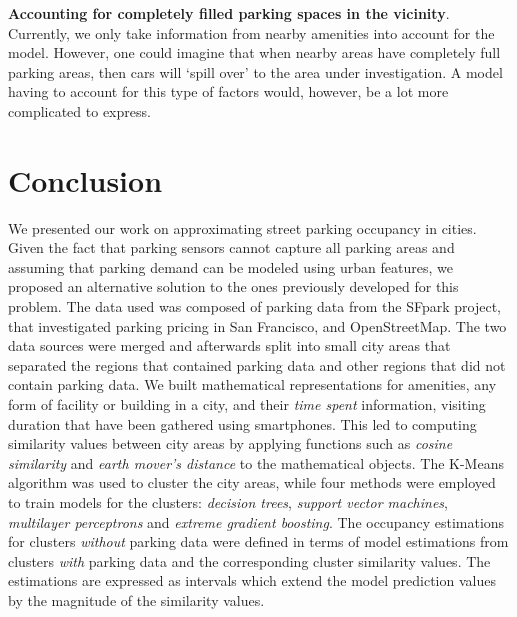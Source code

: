 \begin{romanlist}
		\item \textbf{Accounting for completely filled parking spaces in the vicinity}.
		Currently, we only take information from nearby amenities into account for the model.
		However, one could imagine that when nearby areas have completely full parking areas, then cars will `spill over' to the area under investigation.
		A model having to account for this type of factors would, however, be a lot more complicated to express.
	\end{romanlist} 
	
	
	\section{Conclusion}
	We presented our work on approximating street parking occupancy in cities.
	Given the fact that parking sensors cannot capture all parking areas and assuming that parking demand can be modeled using urban features, we proposed an alternative solution to the ones previously developed for this problem.
	The data used was composed of parking data from the SFpark project, that investigated parking pricing in San Francisco, and OpenStreetMap. The two data sources were merged and afterwards split into small city areas that separated the regions that contained parking data and other regions that did not contain parking data.
	We built mathematical representations for amenities, any form of facility or building in a city, and their \textit{time spent} information, visiting duration that have been gathered using smartphones. This led to computing similarity values between city areas by applying functions such as \textit{cosine similarity} and \textit{earth mover's distance} to the mathematical objects.
	The K-Means algorithm was used to cluster the city areas, while four methods were employed to train models for the clusters: \textit{decision trees}, \textit{support vector machines}, \textit{multilayer perceptrons} and \textit{extreme gradient boosting}.
	The occupancy estimations for clusters \textit{without} parking data were defined in terms of model estimations from clusters \textit{with} parking data and the corresponding cluster similarity values.
	The estimations are expressed as intervals which extend the model prediction values by the magnitude of the similarity values. 
	
